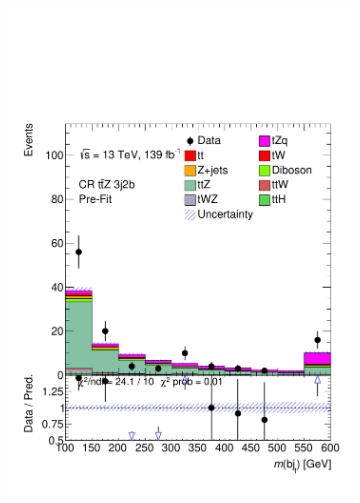 \begin{figure}[!h]
\begin{subfigure}[b]{0.33\linewidth}
    \includegraphics[width=\textwidth]{ubonn-thesis/Chapters/Chapters_08/appendix/data/CR_3j2b.pdf} 
  \end{subfigure}%
  \newline
  \begin{subfigure}[b]{0.33\linewidth}
    \centering

\end{subfigure}
\end{figure}

